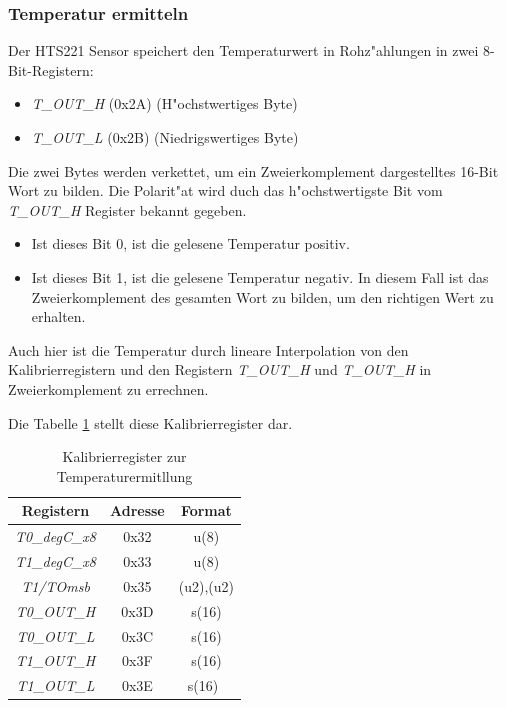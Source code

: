 \vspace{10cm}
\subsubsection{Temperatur ermitteln}
Der HTS221 Sensor speichert den Temperaturwert in Rohz"ahlungen in 
zwei 8-Bit-Registern:

\begin{itemize}
	\item \textit{T\_OUT\_H} (0x2A) (H"ochstwertiges Byte)
	\item \textit{T\_OUT\_L} (0x2B) (Niedrigswertiges Byte)
\end{itemize}

Die zwei Bytes werden verkettet, um ein Zweierkomplement dargestelltes 
16-Bit Wort zu bilden. Die Polarit"at wird duch das h"ochstwertigste Bit 
vom \textit{T\_OUT\_H} Register bekannt gegeben.

\begin{itemize}
	\item Ist dieses Bit 0, ist die gelesene Temperatur positiv.
	\item Ist dieses Bit 1, ist die gelesene Temperatur negativ. In 
	diesem Fall ist das Zweierkomplement des gesamten Wort zu bilden, 
	um den richtigen Wert zu erhalten.
\end{itemize}

Auch hier ist die Temperatur durch lineare Interpolation von den 
Kalibrierregistern und den Registern \textit{T\_OUT\_H} und 
\textit{T\_OUT\_H} in Zweierkomplement zu errechnen.

Die Tabelle \ref{tab:Reg_T} stellt diese Kalibrierregister dar.

\begin{center}
	\begin{table}[htbp] 
		\centering 
		\Large
		\begin{tabular}{c|c|c}
			\textbf{Registern} & \textbf{Adresse} & \textbf{Format} \\
			\hline
			\textit{T0\_degC\_x8} & 0x32	& u(8) \\
			\hline
			\textit{T1\_degC\_x8} & 0x33	& u(8)\\
			\hline
			\textit{T1/TOmsb} & 0x35	& (u2),(u2)\\
			\hline
			\textit{T0\_OUT\_H} 	& 0x3D  & s(16)\\
			\hline
			\textit{T0\_OUT\_L} 	& 0x3C  & s(16)\\
			\hline
			\textit{T1\_OUT\_H}	& 0x3F	& s(16)\\
			\hline
			\textit{T1\_OUT\_L} 	& 0x3E  & s(16)\
		\end{tabular} 
		\caption{Kalibrierregister zur Temperaturermitllung} 
		\label{tab:Reg_T} 
		
	\end{table}
\end{center}

